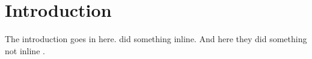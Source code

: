 \chapter{Introduction}

The introduction goes in here.  did something inline. And here they did something not inline \cite{clark-curran:07}.

